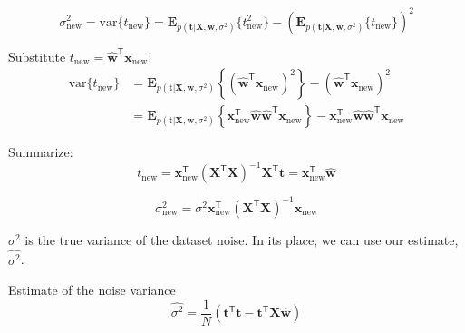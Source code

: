 \documentclass[a4paper,11pt]{article} %
\begin{document}
\begin{equation}
\sigma^2_{\mathrm{new}} = \mathrm{var}\{t_{\mathrm{new}}\} =
\mathbf{E}_{p(\mathbf{t}|\mathbf{X},\mathbf{w},\sigma^2)}\{t^{2}_{\mathrm{new}}\} -
(\mathbf{E}_{p(\mathbf{t}|\mathbf{X},\mathbf{w},\sigma^2)}\{t_{\mathrm{new}}\})^{2}
\end{equation}

Substitute $t_{\mathrm{new}} = \widehat{\mathbf{w}}^{\mathsf{T}}\mathbf{x}_{\mathrm{new}}$:
\begin{align*}
\mathrm{var}\{t_{\mathrm{new}}\} & =
\mathbf{E}_{p(\mathbf{t}|\mathbf{X},\mathbf{w},\sigma^2)}\left\{
\left(\widehat{\mathbf{w}}^{\mathsf{T}}\mathbf{x}_{\mathrm{new}}\right)^2
\right\} - \left(\widehat{\mathbf{w}}^{\mathsf{T}}\mathbf{x}_{\mathrm{new}}\right)^2 \\
& = \mathbf{E}_{p(\mathbf{t}|\mathbf{X},\mathbf{w},\sigma^2)}\left\{
\mathbf{x}_{\mathrm{new}}^{\mathsf{T}} \widehat{\mathbf{w}}
\widehat{\mathbf{w}}^{\mathsf{T}} \mathbf{x}_{\mathrm{new}}
\right\} - \mathbf{x}_{\mathrm{new}}^{\mathsf{T}} \widehat{\mathbf{w}}
\widehat{\mathbf{w}}^{\mathsf{T}} \mathbf{x}_{\mathrm{new}}
\end{align*}

Summarize:
\begin{equation}
t_{\mathrm{new}} = \mathbf{x}_{\mathrm{new}}^{\mathsf{T}}
(\mathbf{X}^{\mathsf{T}}\mathbf{X})^{-1}
\mathbf{X}^{\mathsf{T}}\mathbf{t} = 
\mathbf{x}_{\mathrm{new}}^{\mathsf{T}} \widehat{\mathbf{w}}
\end{equation}

\begin{equation}
\sigma^2_{\mathrm{new}} = \sigma^{2} \mathbf{x}^{\mathsf{T}}_{\mathrm{new}}
(\mathbf{X}^{\mathsf{T}}\mathbf{X})^{-1} \mathbf{x}_{\mathrm{new}}
\end{equation}

$\sigma^2$ is the true variance of the dataset noise. In its place, we can use our
estimate, $\widehat{\sigma^2}$.

Estimate of the noise variance
\begin{equation}
\widehat{\sigma^2} = \frac{1}{N}
\left( \mathbf{t}^{\mathsf{T}}\mathbf{t} - 
\mathbf{t}^{\mathsf{T}}\mathbf{X}\widehat{\mathbf{w}}
\right)
\end{equation}
\end{document}
